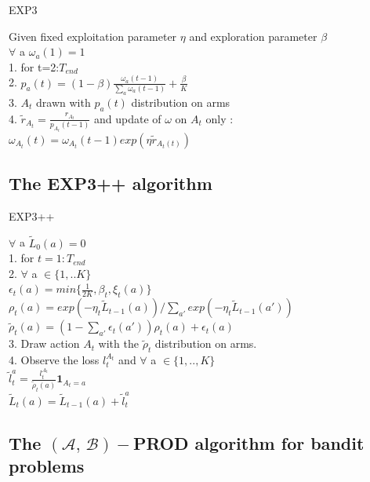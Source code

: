 \documentclass[10.5pt]{article}
\begin{document}
\begin{algorithm}[H]
\caption{EXP3}\label{EXP3}
Given fixed exploitation parameter $\eta$ and exploration parameter $\beta$\\
$\forall$ a $\omega_{a}(1)=1$\\
1. for t=2:$T_{end}$\\
2. $p_{a}(t) = (1-\beta)\frac{\omega_{a}(t-1)}{\sum_{a}\omega_{a}(t-1)}+\frac{\beta}{K}$\\
3. $A_{t}$ drawn with $p_{a}(t)$ distribution on arms\\
4. $\tilde{r}_{A_{t}} = \frac{r_{A_{t}}}{p_{A_{t}}(t-1)}$ and update of $\omega$ on $A_{t}$ only : $\omega_{A_{t}}(t)=\omega_{A_{t}}(t-1)exp(\eta \tilde{r}_{A_{t}(t)})$\\
\end{algorithm}

\subsection*{The EXP3++ algorithm}

\begin{algorithm}[H]
\caption{EXP3++}\label{EXP3++}
$\forall$ a $\tilde{L}_{0}(a)=0$\\
1. for $t=1:T_{end}$~\\
2. $\forall$ a $\in \{1,..K\}$\\
 $\epsilon_{t}(a)=min\{\frac{1}{2K}, \beta_{t}, \xi_{t}(a)\}$ \\
$\rho_{t}(a)=exp(-\eta_{t}\tilde{L}_{t-1}(a))/\sum_{a'}exp(-\eta_{t}\tilde{L}_{t-1}(a'))$\\
$\tilde{\rho}_{t}(a)=(1-\sum_{a'}\epsilon_{t}(a'))\rho_{t}(a)+\epsilon_{t}(a)$\\
3. Draw action $A_{t}$ with the $\tilde{\rho}_{t}$ distribution on arms.~\\
4. Observe the loss $l_{t}^{A_{t}}$ and $\forall$ a $\in \{1,..,K\}$\\
$\tilde{l}_{t}^{a}=\frac{l_{t}^{A_{t}}}{\tilde{\rho}_{t}(a)} \textbf{1}_{A_{t}=a}$\\
$\tilde{L}_{t}(a)=\tilde{L}_{t-1}(a)+\tilde{l}_{t}^{a}$
\end{algorithm}

\subsection*{The $(\mathcal{A},\, \mathcal{B})-$PROD algorithm for bandit problems}
\end{document}
